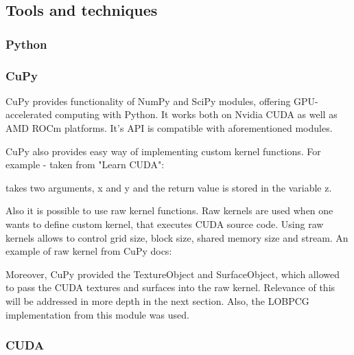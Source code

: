 \subsection{Tools and techniques}

\subsubsection{Python}

\cite{mayavi}


\subsubsection{CuPy}

CuPy provides functionality of NumPy and SciPy modules, offering GPU-accelerated computing with Python. It works both on Nvidia CUDA as well as AMD ROCm platforms. It's API is compatible with aforementioned modules.\cite{cupy_overview}

CuPy also provides easy way of implementing custom kernel functions. For example - taken from "Learn CUDA":\cite{learn_cuda}

\vspace{0.2cm}

takes two arguments, x and y and the return value is stored in the variable z.

Also it is possible to use raw kernel functions. Raw kernels are used when one wants to define custom kernel, that executes CUDA source code. Using raw kernels allows to control grid size, block size, shared memory size and stream. An example of raw kernel from CuPy docs\cite{cupy_raw_kernel}:

\vspace{0.2cm}


Moreover, CuPy provided the TextureObject\cite{cupy_texture} and SurfaceObject\cite{cupy_surface}, which allowed to pass the CUDA textures and surfaces into the raw kernel. Relevance of this will be addressed in more depth in the next section. Also, the LOBPCG implementation from this module was used.\cite{cupy_lobpcg}


\subsubsection{CUDA}


